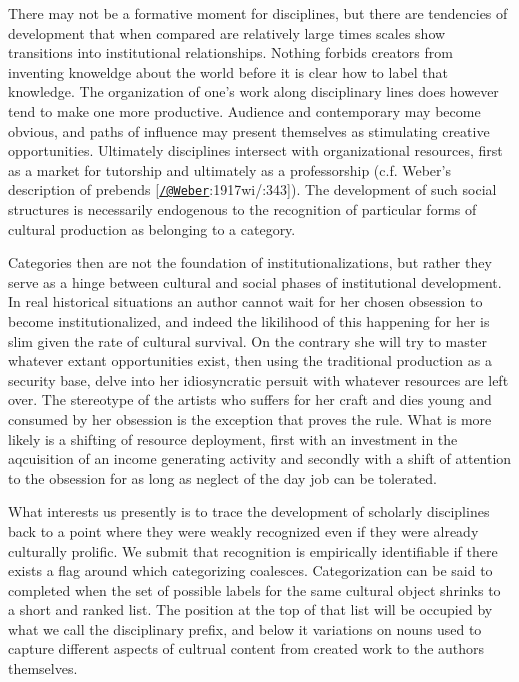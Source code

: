 \documentclass[]{article}
\begin{document}
There may not be a formative moment for disciplines, but there are
tendencies of development that when compared are relatively large times
scales show transitions into institutional relationships. Nothing
forbids creators from inventing knoweldge about the world before it is
clear how to label that knowledge. The organization of one's work along
disciplinary lines does however tend to make one more productive.
Audience and contemporary may become obvious, and paths of influence may
present themselves as stimulating creative opportunities. Ultimately
disciplines intersect with organizational resources, first as a market
for tutorship and ultimately as a professorship (c.f. Weber's
description of prebends
{[}\href{mailto:/@Weber}{\nolinkurl{/@Weber}}:1917wi/:343{]}). The
development of such social structures is necessarily endogenous to the
recognition of particular forms of cultural production as belonging to a
category.

Categories then are not the foundation of institutionalizations, but
rather they serve as a hinge between cultural and social phases of
institutional development. In real historical situations an author
cannot wait for her chosen obsession to become institutionalized, and
indeed the likilihood of this happening for her is slim given the rate
of cultural survival. On the contrary she will try to master whatever
extant opportunities exist, then using the traditional production as a
security base, delve into her idiosyncratic persuit with whatever
resources are left over. The stereotype of the artists who suffers for
her craft and dies young and consumed by her obsession is the exception
that proves the rule. What is more likely is a shifting of resource
deployment, first with an investment in the aqcuisition of an income
generating activity and secondly with a shift of attention to the
obsession for as long as neglect of the day job can be tolerated.

What interests us presently is to trace the development of scholarly
disciplines back to a point where they were weakly recognized even if
they were already culturally prolific. We submit that recognition is
empirically identifiable if there exists a flag around which
categorizing coalesces. Categorization can be said to completed when the
set of possible labels for the same cultural object shrinks to a short
and ranked list. The position at the top of that list will be occupied
by what we call the disciplinary prefix, and below it variations on
nouns used to capture different aspects of cultrual content from created
work to the authors themselves.
\end{document}
